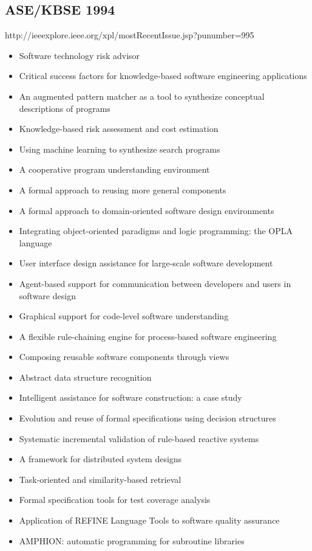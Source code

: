 \subsection{ASE/KBSE 1994}

http://ieeexplore.ieee.org/xpl/mostRecentIssue.jsp?punumber=995

{\small
\begin{itemize}[itemsep=-1ex]
  \item Software technology risk advisor
  \item Critical success factors for knowledge-based software engineering applications
  \item An augmented pattern matcher as a tool to synthesize conceptual descriptions of programs
  \item Knowledge-based risk assessment and cost estimation
  \item Using machine learning to synthesize search programs
  \item A cooperative program understanding environment
  \item A formal approach to reusing more general components
  \item A formal approach to domain-oriented software design environments
  \item Integrating object-oriented paradigms and logic programming: the OPLA language
  \item User interface design assistance for large-scale software development
  \item Agent-based support for communication between developers and users in software design
  \item Graphical support for code-level software understanding
  \item A flexible rule-chaining engine for process-based software engineering
  \item Composing reusable software components through views
  \item Abstract data structure recognition
  \item Intelligent assistance for software construction: a case study
  \item Evolution and reuse of formal specifications using decision structures
  \item Systematic incremental validation of rule-based reactive systems
  \item A framework for distributed system designs
  \item Task-oriented and similarity-based retrieval
  \item Formal specification tools for test coverage analysis
  \item Application of REFINE Language Tools to software quality assurance
  \item AMPHION: automatic programming for subroutine libraries 
\end{itemize}
}


